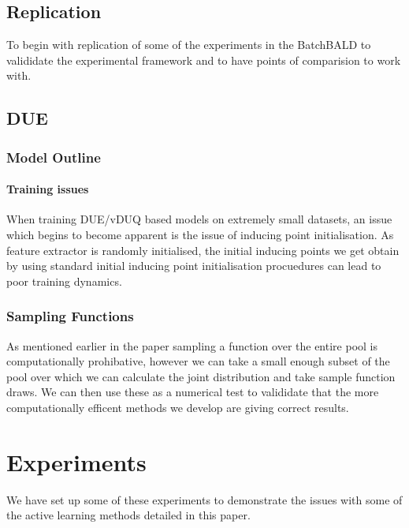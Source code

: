 \documentclass[12pt, a4paper]{report}
\theoremstyle{definition}
\theoremstyle{definition}
\theoremstyle{definition}
\begin{document}
\section{Replication}

To begin with replication of some of the experiments in the BatchBALD to valididate the experimental framework and to have points of comparision to work with.




\section{DUE}

\subsection{Model Outline}


\subsubsection{Training issues}

When training DUE/vDUQ based models on extremely small datasets, an issue which begins to become apparent is the issue of inducing point initialisation. As feature extractor is randomly initialised, the initial inducing points we get obtain by using standard initial inducing point initialisation procuedures can lead to poor training dynamics.





\subsection{Sampling Functions}

As mentioned earlier in the paper sampling a function over the entire pool is computationally prohibative, however we can take a small enough subset of the pool over which we can calculate the joint distribution and take sample function draws.
We can then use these as a numerical test to valididate that the more computationally efficent methods we develop are giving correct results.


\chapter{Experiments}

We have set up some of these experiments to demonstrate the issues with some of the active learning methods detailed in this paper.
\end{document}
